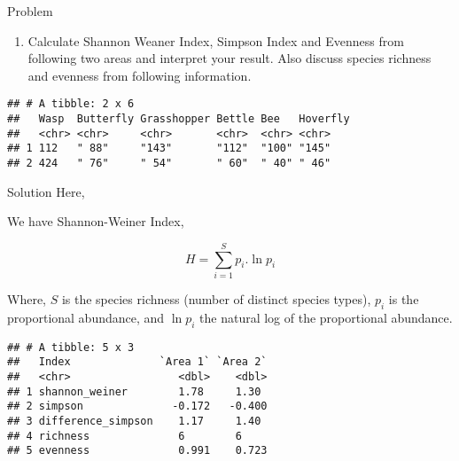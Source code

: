 \documentclass[
  ignorenonframetext,
  aspectratio=169]{beamer}
\providecommand{\tightlist}{%
  \setlength{\itemsep}{0pt}\setlength{\parskip}{0pt}}
\begin{document}
\begin{frame}[fragile]{Problem}
\protect\hypertarget{problem}{}
\begin{enumerate}
\tightlist
\item
  Calculate Shannon Weaner Index, Simpson Index and Evenness from
  following two areas and interpret your result. Also discuss species
  richness and evenness from following information.
\end{enumerate}

\begin{verbatim}
## # A tibble: 2 x 6
##   Wasp  Butterfly Grasshopper Bettle Bee   Hoverfly
##   <chr> <chr>     <chr>       <chr>  <chr> <chr>   
## 1 112   " 88"     "143"       "112"  "100" "145"   
## 2 424   " 76"     " 54"       " 60"  " 40" " 46"
\end{verbatim}
\end{frame}

\begin{frame}{Solution}
\protect\hypertarget{solution}{}
Here,

We have Shannon-Weiner Index,

\[ 
H = \sum_{i = 1}^S{p_i.\ln p_i}
\]

Where, \(S\) is the species richness (number of distinct species types),
\(p_i\) is the proportional abundance, and \(\ln p_i\) the natural log
of the proportional abundance.
\end{frame}

\begin{frame}[fragile]{}
\protect\hypertarget{section-5}{}
\begin{verbatim}
## # A tibble: 5 x 3
##   Index              `Area 1` `Area 2`
##   <chr>                 <dbl>    <dbl>
## 1 shannon_weiner        1.78     1.30 
## 2 simpson              -0.172   -0.400
## 3 difference_simpson    1.17     1.40 
## 4 richness              6        6    
## 5 evenness              0.991    0.723
\end{verbatim}
\end{frame}
\end{document}
